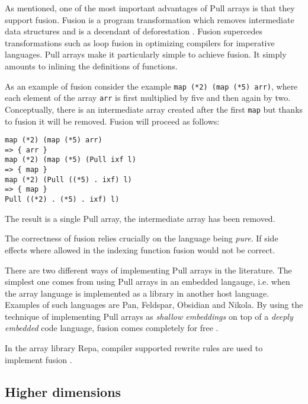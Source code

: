 \documentclass{sigplanconf}
\begin{document}
As mentioned, one of the most important advantages of Pull arrays is
that they support
fusion\cite{gill1993short,axelsson2010feldspar,keller2010regular}. Fusion
is a program transformation which removes intermediate data structures
and is a decendant of deforestation
\cite{wadler1990deforestation}. Fusion supercedes transformations such
as loop fusion in optimizing compilers for imperative languages.  Pull
arrays make it particularly simple to achieve fusion. It simply
amounts to inlining the definitions of functions.

As an example of fusion consider the example
\verb!map (*2) (map (*5) arr)!, where each element of the array
\verb!arr! is first multiplied by five and then again by
two. Conceptually, there is an intermediate array created after the
first \verb!map! but thanks to fusion it will be removed. Fusion will proceed
as follows:

\begin{verbatim}
map (*2) (map (*5) arr)
=> { arr }
map (*2) (map (*5) (Pull ixf l)
=> { map }
map (*2) (Pull ((*5) . ixf) l)
=> { map }
Pull ((*2) . (*5) . ixf) l)
\end{verbatim}

The result is a single Pull array, the intermediate array has been removed.

The correctness of fusion relies crucially on the language being
\emph{pure}. If side effects where allowed in the indexing function
fusion would not be correct.

There are two different ways of implementing Pull arrays in the
literature. The simplest one comes from using Pull arrays in an
embedded langauge, i.e. when the array language is implemented as a
library in another host language. Examples of such languages are
Pan\cite{elliott2003compiling}, Feldspar\cite{Axelsson:2010:Feldspar},
Obsidian\cite{Svensson:2011:Obsidian} and
Nikola\cite{Mainland:2010:Nikola}. By using the technique of
implementing Pull arrays as \emph{shallow embeddings} on top of a
\emph{deeply embedded} code language, fusion comes completely for free
\cite{svenningsson2013combining}.

In the array library Repa\cite{keller2010regular}, compiler supported
rewrite rules are used to implement fusion \cite{jones2001playing}.


\subsection{Higher dimensions}
\end{document}
